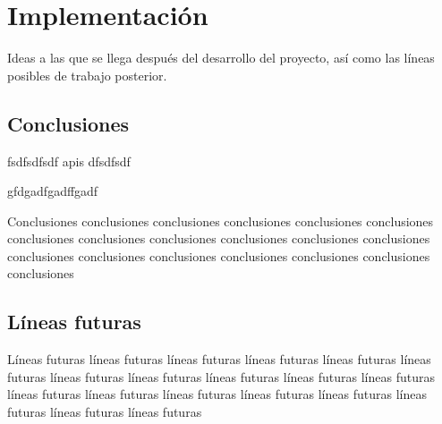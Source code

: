 \vspace*{-1cm}
\section{Implementación}
\label{sec:implementacion}

Ideas a las que se llega después del desarrollo del proyecto, así como las líneas posibles de trabajo posterior.

\subsection{Conclusiones}

fsdfsdfsdf \glspl{api} dfsdfsdf 

gfdgadfgadffgadf \cite{android_developers_architectures}

Conclusiones conclusiones conclusiones conclusiones conclusiones conclusiones conclusiones conclusiones conclusiones conclusiones conclusiones conclusiones conclusiones conclusiones conclusiones conclusiones conclusiones conclusiones conclusiones

\subsection{Líneas futuras}
Líneas futuras líneas futuras líneas futuras líneas futuras líneas futuras líneas futuras líneas futuras líneas futuras líneas futuras líneas futuras líneas futuras líneas futuras líneas futuras líneas futuras líneas futuras líneas futuras líneas futuras líneas futuras líneas futuras